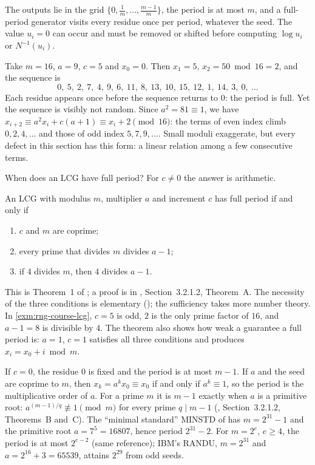 The outputs lie in the grid $\{0,\frac1m,\dots,\frac{m-1}m\}$, the period is at most $m$,
and a full-period generator visits every residue once per period, whatever the seed. The
value $u_i=0$ can occur and must be removed or shifted before computing $\log u_i$ or
$N^{-1}(u_i)$.

\begin{example}\label{exm:rng-course-lcg}
Take $m=16$, $a=9$, $c=5$ and $x_0=0$. Then $x_1=5$, $x_2=50\bmod16=2$, and the sequence
is
\[
  0,\ 5,\ 2,\ 7,\ 4,\ 9,\ 6,\ 11,\ 8,\ 13,\ 10,\ 15,\ 12,\ 1,\ 14,\ 3,\ 0,\ \dots
\]
Each residue appears once before the sequence returns to $0$: the period is full. Yet the
sequence is visibly not random. Since $a^2=81\equiv1$, we have
$x_{i+2}\equiv a^2x_i+c(a+1)\equiv x_i+2\pmod{16}$: the terms of even index climb
$0,2,4,\dots$ and those of odd index $5,7,9,\dots$. Small moduli exaggerate, but every
defect in this section has this form: a linear relation among a few consecutive terms.
\end{example}

When does an LCG have full period? For $c\ne0$ the answer is arithmetic.

\begin{theorem}\label{thm:rng-hull-dobell}
An LCG with modulus $m$, multiplier $a$ and increment $c$ has full period if and only if
\begin{enumerate}[label=(\roman*)]
  \item $c$ and $m$ are coprime;
  \item every prime that divides $m$ divides $a-1$;
  \item if $4$ divides $m$, then $4$ divides $a-1$.
\end{enumerate}
\end{theorem}

This is Theorem~1 of \textcite{hull-dobell}; a proof is in \textcite{knuth-taocp2},
Section~3.2.1.2, Theorem~A. The necessity of the three conditions is elementary
(); the sufficiency takes more number theory. In
\cref{exm:rng-course-lcg}, $c=5$ is odd, $2$ is the only prime factor of $16$, and $a-1=8$ is
divisible by $4$. The theorem also shows how weak a guarantee a full period is: $a=1$,
$c=1$ satisfies all three conditions and produces $x_i=x_0+i\bmod m$.

\begin{remark}\label{rem:rng-multiplicative}
If $c=0$, the residue $0$ is fixed and the period is at most $m-1$. If $a$ and the seed are
coprime to $m$, then $x_k=a^kx_0\equiv x_0$ if and only if $a^k\equiv1$, so the period is the
multiplicative order of $a$. For a prime $m$ it is $m-1$ exactly when $a$ is a primitive root:
$a^{(m-1)/q}\not\equiv1\pmod m$ for every prime $q\mid m-1$ (\textcite{knuth-taocp2},
Section~3.2.1.2, Theorems~B and~C). The ``minimal standard'' MINSTD of \textcite{park-miller}
has $m=2^{31}-1$ and the primitive root $a=7^5=16807$, hence period $2^{31}-2$. For $m=2^e$,
$e\ge4$, the period is at most $2^{e-2}$ (same reference); IBM's RANDU, $m=2^{31}$ and
$a=2^{16}+3=65539$, attains $2^{29}$ from odd seeds.
\end{remark}

